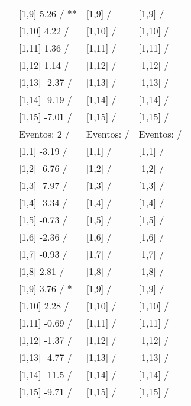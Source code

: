 \begin{table}
\begin{tabular}[t]{llll}
\addlinespace
 & {}[1,9] 5.26  / ** & {}[1,9]  / & {}[1,9]  /\\
 & {}[1,10] 4.22  / & {}[1,10]  / & {}[1,10]  /\\
 & {}[1,11] 1.36  / & {}[1,11]  / & {}[1,11]  /\\
 & {}[1,12] 1.14  / & {}[1,12]  / & {}[1,12]  /\\
 & {}[1,13] -2.37  / & {}[1,13]  / & {}[1,13]  /\\
\addlinespace
 & {}[1,14] -9.19  / & {}[1,14]  / & {}[1,14]  /\\
 & {}[1,15] -7.01  / & {}[1,15]  / & {}[1,15]  /\\
 & Eventos:  2 / & Eventos:   / & Eventos:   /\\
 & {}[1,1] -3.19  / & {}[1,1]  / & {}[1,1]  /\\
 & {}[1,2] -6.76  / & {}[1,2]  / & {}[1,2]  /\\
\addlinespace
 & {}[1,3] -7.97  / & {}[1,3]  / & {}[1,3]  /\\
 & {}[1,4] -3.34  / & {}[1,4]  / & {}[1,4]  /\\
 & {}[1,5] -0.73  / & {}[1,5]  / & {}[1,5]  /\\
 & {}[1,6] -2.36  / & {}[1,6]  / & {}[1,6]  /\\
 & {}[1,7] -0.93  / & {}[1,7]  / & {}[1,7]  /\\
\addlinespace
500 & {}[1,8] 2.81  / & {}[1,8]  / & {}[1,8]  /\\
 & {}[1,9] 3.76  / * & {}[1,9]  / & {}[1,9]  /\\
 & {}[1,10] 2.28  / & {}[1,10]  / & {}[1,10]  /\\
 & {}[1,11] -0.69  / & {}[1,11]  / & {}[1,11]  /\\
 & {}[1,12] -1.37  / & {}[1,12]  / & {}[1,12]  /\\
\addlinespace
 & {}[1,13] -4.77  / & {}[1,13]  / & {}[1,13]  /\\
 & {}[1,14] -11.5  / & {}[1,14]  / & {}[1,14]  /\\
 & {}[1,15] -9.71  / & {}[1,15]  / & {}[1,15]  /\\
\bottomrule
\end{tabular}
\end{table}
